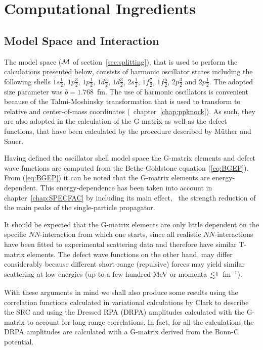 \section{Computational Ingredients\label{sec:PPcompset}}


\subsection{Model Space and Interaction}
The model space ($\calM$ of section~\ref{sec:splitting}), that is used
to perform the calculations presented below, consists of harmonic oscillator
states including the following shells
 $1s\frac{1}{2}$, 
 $1p\frac{3}{2}$, 
 $1p\frac{1}{2}$, 
 $1d\frac{5}{2}$, 
 $1d\frac{3}{2}$, 
 $2s\frac{1}{2}$, 
 $1f\frac{7}{2}$, 
 $1f\frac{5}{2}$, 
 $2p\frac{3}{2}$ and
 $2p\frac{1}{2}$.
The adopted size parameter was $b=1.768$~fm. The use of harmonic oscillators 
is convenient because of the Talmi-Moshinsky transformation that is used 
to transform to relative and center-of-mass coordinates 
(\cf\ chapter~\ref{chap:ppknock}). 
As such, they are
also adopted in the calculation of the G-matrix as well as the defect functions,
that have been  calculated by the procedure described by 
M\"uther and Sauer\cite{MS93a}.

Having defined the oscillator shell model space 
the G-matrix elements and defect 
wave functions are computed from the Bethe-Goldstone equation (\ref{eq:BGEP}). 
From (\ref{eq:BGEP}) it can be noted that the G-matrix elements are 
energy-dependent. This energy-dependence has been taken into account 
in chapter~\ref{chap:SPECFAC} by 
including its main effect, \viz\ the strength reduction of the main peaks of 
the single-particle propagator.

It should be expected that the G-matrix elements are only little dependent on 
the specific $NN$-interaction from which one starts\cite{MS93a}, 
since all realistic 
$NN$-interactions have been fitted to experimental scattering data and 
therefore have similar T-matrix elements. The defect wave functions on the 
other hand, may differ considerably because different short-range (repulsive) 
forces may yield similar scattering at low energies (up to a few hundred 
MeV or momenta $\onglt 1$~fm$^{-1}$).

With these arguments in mind we shall also produce some results using the 
correlation functions calculated in variational calculations by 
Clark\cite{Cl81} to describe the SRC and using the Dressed RPA (DRPA) 
amplitudes calculated with the 
G-matrix to account for long-range correlations. 
In fact, for all the calculations the DRPA amplitudes are calculated 
with a G-matrix derived from the Bonn-C potential\cite{Ma89}.

